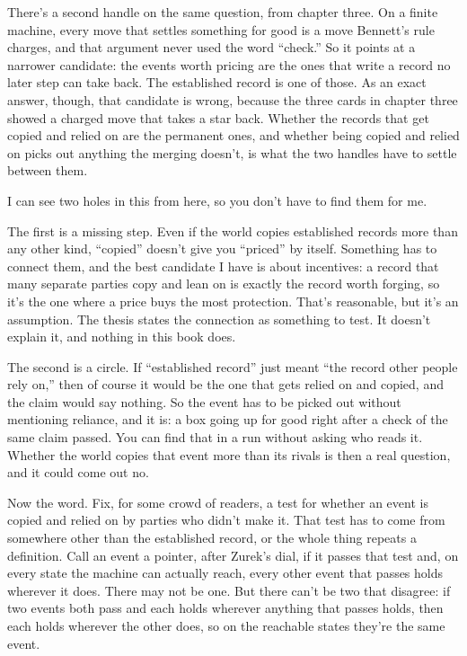\documentclass[11pt,twoside]{article}
\theoremstyle{thielethm}
\theoremstyle{thieledef}
\theoremstyle{thieledef}
\theoremstyle{thieledef}
\theoremstyle{thielethm}
\theoremstyle{thieleobs}
\theoremstyle{thielethm}
\begin{document}
There's a second handle on the same question, from chapter three. On a finite machine, every move that settles something for good is a move Bennett's rule charges, and that argument never used the word ``check.'' So it points at a narrower candidate: the events worth pricing are the ones that write a record no later step can take back. The established record is one of those. As an exact answer, though, that candidate is wrong, because the three cards in chapter three showed a charged move that takes a star back. Whether the records that get copied and relied on are the permanent ones, and whether being copied and relied on picks out anything the merging doesn't, is what the two handles have to settle between them.

I can see two holes in this from here, so you don't have to find them for me.

The first is a missing step. Even if the world copies established records more than any other kind, ``copied'' doesn't give you ``priced'' by itself. Something has to connect them, and the best candidate I have is about incentives: a record that many separate parties copy and lean on is exactly the record worth forging, so it's the one where a price buys the most protection. That's reasonable, but it's an assumption. The thesis states the connection as something to test. It doesn't explain it, and nothing in this book does.

The second is a circle. If ``established record'' just meant ``the record other people rely on,'' then of course it would be the one that gets relied on and copied, and the claim would say nothing. So the event has to be picked out without mentioning reliance, and it is: a box going up for good right after a check of the same claim passed. You can find that in a run without asking who reads it. Whether the world copies that event more than its rivals is then a real question, and it could come out no.

Now the word. Fix, for some crowd of readers, a test for whether an event is copied and relied on by parties who didn't make it. That test has to come from somewhere other than the established record, or the whole thing repeats a definition. Call an event a pointer, after Zurek's dial, if it passes that test and, on every state the machine can actually reach, every other event that passes holds wherever it does. There may not be one. But there can't be two that disagree: if two events both pass and each holds wherever anything that passes holds, then each holds wherever the other does, so on the reachable states they're the same event.
\end{document}
